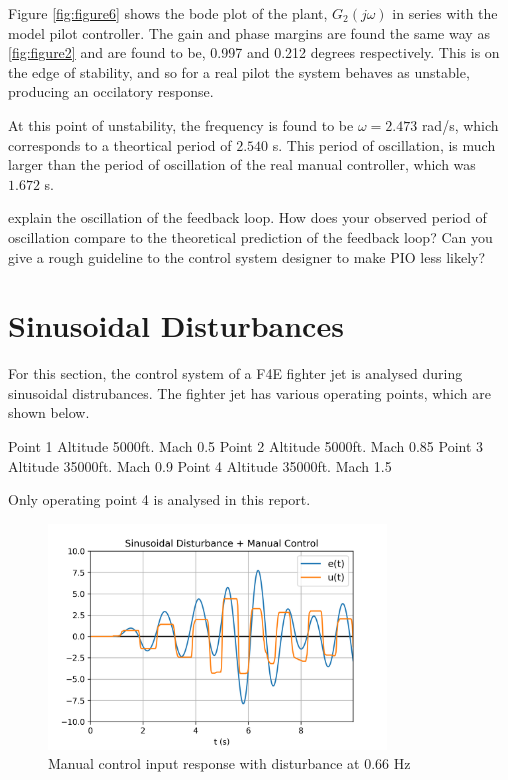 \documentclass[8pt]{article}
\begin{document}
Figure \ref{fig:figure6} shows the bode plot of the plant, $G_2(j\omega)$ in series with the model pilot controller.
The gain and phase margins are found the same way as \ref{fig:figure2} and are found to be, 0.997 and 0.212 degrees respectively.
This is on the edge of stability, and so for a real pilot the system behaves as unstable, producing an occilatory response.

At this point of unstability, the frequency is found to be $\omega = 2.473$ rad/s, which corresponds to a theortical period of $2.540$ s.
This period of oscillation, is much larger than the period of oscillation of the real manual controller, which was $1.672$ s.

explain the oscillation of the feedback loop. How does your observed period of oscillation compare to the theoretical prediction of the feedback loop?
Can you give a rough guideline to the control system designer to make PIO less likely?

\section{Sinusoidal Disturbances}

For this section, the control system of a F4E fighter jet is analysed during sinusoidal distrubances.
The fighter jet has various operating points, which are shown below.

Point 1 Altitude 5000ft. Mach 0.5
Point 2 Altitude 5000ft. Mach 0.85
Point 3 Altitude 35000ft. Mach 0.9
Point 4 Altitude 35000ft. Mach 1.5

Only operating point 4 is analysed in this report.

\begin{figure}[H]
    \centering
    \includegraphics[width=0.8\textwidth]{figures/FIGURE_7.png}
    \caption{Manual control input response with disturbance at $0.66$ Hz}
    \label{fig:figure7}
\end{figure}
\end{document}

